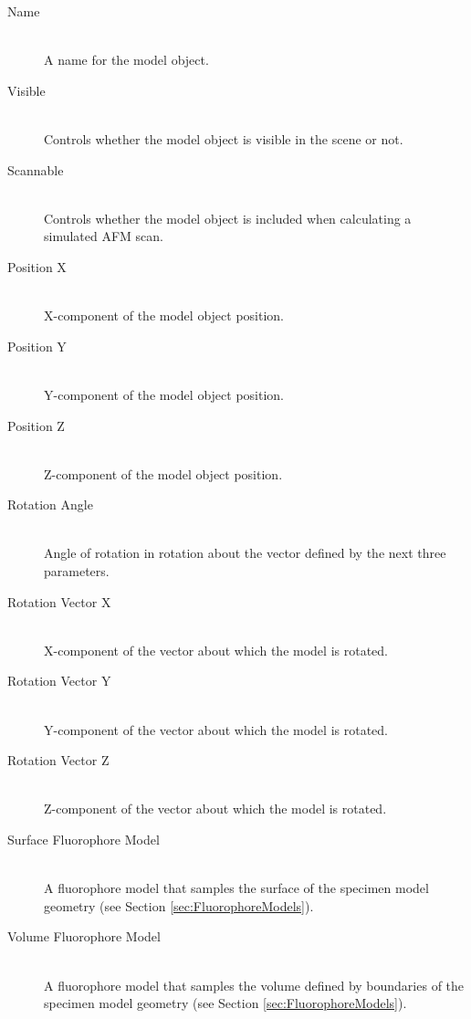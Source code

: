 \documentclass[11pt,titlepage]{article}
\begin{document}
\begin{description}

  \item[Name] \hfill \\
  A name for the model object.
  
  \item[Visible] \hfill \\
  Controls whether the model object is visible in the scene or not.

  \item[Scannable] \hfill \\
  Controls whether the model object is included when calculating a simulated AFM scan.

  \item[Position X] \hfill \\
   X-component of the model object position.

  \item[Position Y] \hfill \\
  Y-component of the model object position.

  \item[Position Z] \hfill \\
  Z-component of the model object position.
  
  \item[Rotation Angle] \hfill \\
  Angle of rotation in rotation about the vector defined by the next three parameters.
  
  \item[Rotation Vector X] \hfill \\
  X-component of the vector about which the model is rotated.
  
  \item[Rotation Vector Y] \hfill \\
  Y-component of the vector about which the model is rotated.
  
  \item[Rotation Vector Z] \hfill \\
  Z-component of the vector about which the model is rotated.
  
  \item[Surface Fluorophore Model] \hfill \\
  A fluorophore model that samples the surface of the specimen model geometry (see Section \ref{sec:FluorophoreModels}).
  
  \item[Volume Fluorophore Model] \hfill \\
  A fluorophore model that samples the volume defined by boundaries of the specimen model geometry (see Section \ref{sec:FluorophoreModels}).

\end{description}
\end{document}
